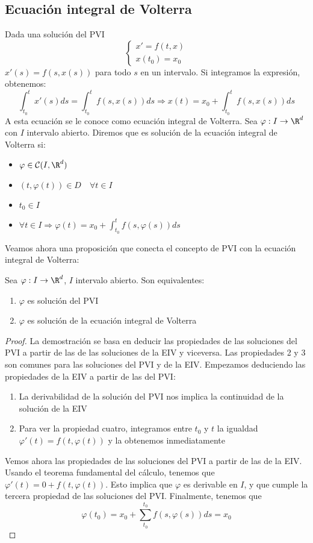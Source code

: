 \documentclass{article}
\begin{document}
\subsection{Ecuación integral de Volterra}

Dada una solución del PVI
\[
  \left\{
    \begin{array}{l}
      x' = f(t,x) \\
      x(t_0) = x_0
    \end{array}
  \right.
\]
$x'(s) = f(s,x(s))$ para todo $s$ en un intervalo. Si integramos la expresión, obtenemos:
$$ \int_{t_0}^t x'(s)ds = \int_{t_0}^tf(s,x(s))ds \Rightarrow x(t) = x_0 + \int_{t_0}^t f(s, x(s))ds $$
A esta ecuación se le conoce como ecuación integral de Volterra. Sea $\varphi: I \to \R^d$ con $I$
intervalo abierto. Diremos que es solución de la ecuación integral de Volterra si:

\begin{itemize}
\item $\varphi \in \mathcal{C}(I, \R^d)$
\item $(t, \varphi(t)) \in D \quad \forall t \in I$
\item $t_0 \in I$
\item $\forall t \in I \Rightarrow \varphi(t) = x_0 + \displaystyle\int_{t_0}^t f(s, \varphi(s))ds$
\end{itemize}

Veamos ahora una proposición que conecta el concepto de PVI con la ecuación integral de Volterra:

\begin{prop}
  Sea $\varphi: I \to \R^d$, $I$ intervalo abierto. Son equivalentes:
  \begin{enumerate}
  \item $\varphi$ es solución del PVI
  \item $\varphi$ es solución de la ecuación integral de Volterra
  \end{enumerate}
\end{prop}

\begin{proof}
  La demostración se basa en deducir las propiedades de las soluciones del PVI a partir de las de
  las soluciones de la EIV y viceversa. Las propiedades 2 y 3 son comunes para las soluciones del
  PVI y de la EIV. Empezamos deduciendo las propiedades de la EIV a partir de las del PVI:
  \begin{enumerate}
  \item La derivabilidad de la solución del PVI nos implica la continuidad de la solución de la EIV
  \item Para ver la propiedad cuatro, integramos entre $t_0$ y $t$ la igualdad
    $\varphi'(t) = f(t, \varphi(t))$ y la obtenemos inmediatamente
  \end{enumerate}
  Vemos ahora las propiedades de las soluciones del PVI a partir de las de la EIV.  Usando el
  teorema fundamental del cálculo, tenemos que $\varphi'(t) = 0 + f(t, \varphi(t))$.  Esto implica
  que $\varphi$ es derivable en $I$, y que cumple la tercera propiedad de las soluciones del
  PVI. Finalmente, tenemos que
    $$ \varphi(t_0) = x_0 + \sum_{t_0}^{t_0} f(s, \varphi(s))ds = x_0 $$
  \end{proof}
\end{document}
